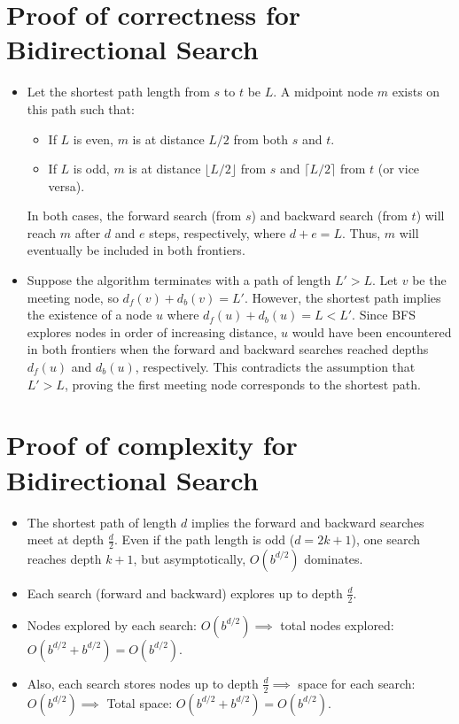 \begin{appendices}
\section{Proof of correctness for Bidirectional Search}\label{appendix:Bidirectional:correctness}
	\begin{itemize}
		\item Let the shortest path length from $s$ to $t$ be $L$. A midpoint node $m$ exists on this path such that:
		\begin{itemize}
			\item If $L$ is even, $m$ is at distance $L/2$ from both $s$ and $t$.
			\item If $L$ is odd, $m$ is at distance $\lfloor L/2 \rfloor$ from $s$ and $\lceil L/2 \rceil$ from $t$ (or vice versa).
		\end{itemize}
		In both cases, the forward search (from $s$) and backward search (from $t$) will reach $m$ after $d$ and $e$ steps, respectively, where $d + e = L$. Thus, $m$ will eventually be included in both frontiers.
		\item Suppose the algorithm terminates with a path of length $L' > L$. Let $v$ be the meeting node, so $d_f(v) + d_b(v) = L'$. However, the shortest path implies the existence of a node $u$ where $d_f(u) + d_b(u) = L < L'$. Since BFS explores nodes in order of increasing distance, $u$ would have been encountered in both frontiers when the forward and backward searches reached depths $d_f(u)$ and $d_b(u)$, respectively. This contradicts the assumption that $L' > L$, proving the first meeting node corresponds to the shortest path.
	\end{itemize}
\section{Proof of complexity for Bidirectional Search}\label{appendix:Bidirectional:complexity}
	\begin{itemize}
		\item The shortest path of length $d$ implies the forward and backward searches meet at depth $\frac{d}{2}$. Even if the path length is odd ($d = 2k + 1$), one search reaches depth $k + 1$, but asymptotically, $O(b^{d/2})$ dominates.
		\item Each search (forward and backward) explores up to depth $\frac{d}{2}$.
		\item  Nodes explored by each search: $O(b^{d/2}) \implies$ total nodes explored: $O(b^{d/2} + b^{d/2}) = O(b^{d/2})$.
		\item Also, each search stores nodes up to depth $\frac{d}{2} \implies$  space for each search: $O(b^{d/2}) \implies$ Total space: $O(b^{d/2} + b^{d/2}) = O(b^{d/2})$.
	\end{itemize}


\end{appendices}
